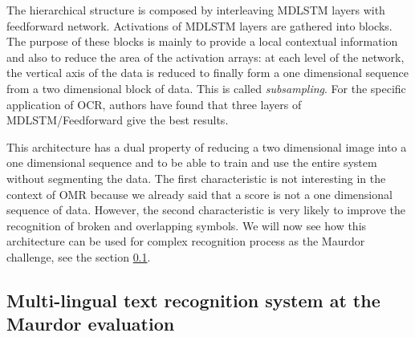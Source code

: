 \documentclass[11pt]{sdm}
\begin{document}
The hierarchical structure is composed by interleaving MDLSTM layers with feedforward network.
Activations of MDLSTM layers are gathered into blocks.
The purpose of these blocks is mainly to provide a local contextual information and also to reduce the area of the activation arrays: at each level of the network, the vertical axis of the data is reduced to finally form a one dimensional sequence from a two dimensional block of data.
This is called \textit{subsampling}.
For the specific application of OCR, authors have found that three layers of MDLSTM/Feedforward give the best results.

This architecture has a dual property of reducing a two dimensional image into a one dimensional sequence and to be able to train and use the entire system without segmenting the data.
The first characteristic is not interesting in the context of OMR because we already said that a score is not a one dimensional sequence of data.
However, the second characteristic is very likely to improve the recognition of broken and overlapping symbols.
We will now see how this architecture can be used for complex recognition process as the Maurdor challenge, see the section \ref{ssec:maurdor}.

\subsection{Multi-lingual text recognition system at the Maurdor evaluation} \label{ssec:maurdor}
\end{document}
